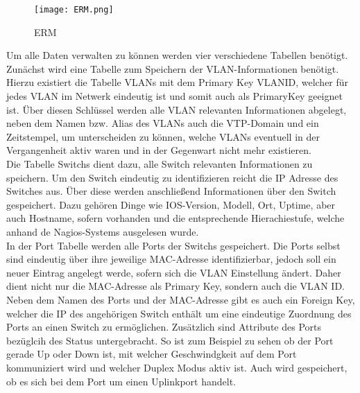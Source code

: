 \begin{figure}[H]
\centering
\texttt{[image: ERM.png]}
\caption{ERM}
\label{fig:erm}
\end{figure}

Um alle Daten verwalten zu können werden vier verschiedene Tabellen benötigt.
Zunächst wird eine Tabelle zum Speichern der VLAN-Informationen benötigt. Hierzu existiert die Tabelle VLANs mit dem Primary Key VLANID, welcher für jedes VLAN im Netwerk eindeutig ist und somit auch als PrimaryKey geeignet ist. Über diesen Schlüssel werden alle VLAN relevanten Informationen abgelegt, neben dem Namen bzw. Alias des VLANs auch die VTP-Domain und ein Zeitstempel, um unterscheiden zu können, welche VLANs eventuell in der Vergangenheit aktiv waren und in der Gegenwart nicht mehr existieren.\\
Die Tabelle Switchs dient dazu, alle Switch relevanten Informationen zu speichern. 
Um den Switch eindeutig zu identifizieren reicht die IP Adresse des Switches aus. Über diese werden anschließend Informationen über den Switch gespeichert. Dazu gehören Dinge wie IOS-Version, Modell, Ort, Uptime, aber auch Hostname, sofern vorhanden und die entsprechende Hierachiestufe, welche anhand de Nagios-Systems ausgelesen wurde.\\
In der Port Tabelle werden alle Ports der Switchs gespeichert. Die Ports selbst sind eindeutig über ihre jeweilige MAC-Adresse identifizierbar, jedoch soll ein neuer Eintrag angelegt werde, sofern sich die VLAN Einstellung ändert. Daher dient nicht nur die MAC-Adresse als Primary Key, sondern auch die VLAN ID. Neben dem Namen des Ports und der MAC-Adresse gibt es auch ein Foreign Key, welcher die IP des angehörigen Switch enthält um eine eindeutige Zuordnung des Ports an einen Switch zu ermöglichen. Zusätzlich sind Attribute des Ports bezüglcih des Status untergebracht. So ist zum Beispiel zu sehen ob der Port gerade Up oder Down ist, mit welcher Geschwindgkeit auf dem Port kommuniziert wird und welcher Duplex Modus aktiv ist. Auch wird gespeichert, ob es sich bei dem Port um einen Uplinkport handelt.\\

